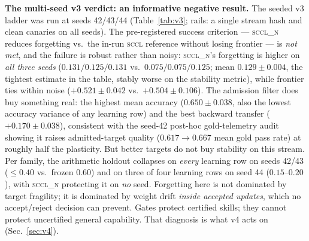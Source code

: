 \documentclass[10pt,conference]{IEEEtran}
\begin{document}
\textbf{The multi-seed v3 verdict: an informative negative result.} The seeded v3 ladder was run at seeds 42/43/44 (Table~\ref{tab:v3}; rails: a single stream hash and clean canaries on all seeds). The pre-registered success criterion --- \textsc{sccl\_n} reduces forgetting vs.\ the in-run \textsc{sccl} reference without losing frontier --- is \emph{not met}, and the failure is robust rather than noisy: \textsc{sccl\_n}'s forgetting is higher on \emph{all three seeds} ($0.131/0.125/0.131$ vs.\ $0.075/0.075/0.125$; mean $0.129 \pm 0.004$, the tightest estimate in the table, stably worse on the stability metric), while frontier ties within noise ($+0.521 \pm 0.042$ vs.\ $+0.504 \pm 0.106$). The admission filter does buy something real: the highest mean accuracy ($0.650 \pm 0.038$, also the lowest accuracy variance of any learning row) and the best backward transfer ($+0.170 \pm 0.038$), consistent with the seed-42 post-hoc gold-telemetry audit showing it raises admitted-target quality ($0.617 \to 0.667$ mean gold pass rate) at roughly half the plasticity. But better targets do not buy stability on this stream. Per family, the arithmetic holdout collapses on \emph{every} learning row on seeds 42/43 ($\le 0.40$ vs.\ frozen $0.60$) and on three of four learning rows on seed 44 ($0.15$--$0.20$), with \textsc{sccl\_n} protecting it on \emph{no} seed. Forgetting here is not dominated by target fragility; it is dominated by weight drift \emph{inside accepted updates}, which no accept/reject decision can prevent. Gates protect certified skills; they cannot protect uncertified general capability. That diagnosis is what v4 acts on (Sec.~\ref{sec:v4}).
\end{document}
